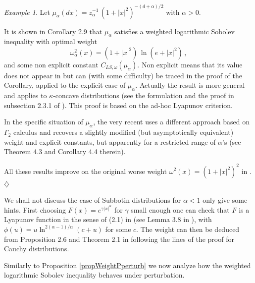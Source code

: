 \documentclass[11pt,reqno]{amsart}
\numberwithin{equation}{section}
\theoremstyle{definition}
\theoremstyle{remark}
\newtheorem{example}[theorem]{Example}
\begin{document}
\begin{example}\label{examplscauchy}
Let $\mu_\alpha(dx)= z_\alpha^{-1} \, (1+|x|^2)^{-(d+\alpha)/2}$ with $\alpha >0$. 

It is shown in \cite{CGWu} Corollary 2.9 that $\mu_\alpha$ satisfies a weighted logarithmic Sobolev inequality with optimal weight $$\omega_\alpha^2(x) = (1+|x|^2) \, \ln(e+|x|^2) \, ,$$ and some non explicit constant $C_{LS,\omega}(\mu_\alpha)$. Non explicit means that its value does not appear in \cite{CGWu} but can (with some difficulty) be traced in the proof of the Corollary, applied to the explicit case of $\mu_\alpha$. Actually the result is more general and applies to $\kappa$-concave distributions (see the formulation and the proof in subsection 2.3.1 of \cite{CGWu}). This proof is based on the ad-hoc Lyapunov criterion.

In the specific situation of $\mu_\alpha$, the very recent \cite{HugLS} uses a different approach based on $\Gamma_2$ calculus and recovers a slightly modified (but asymptotically equivalent)  weight and explicit constants, but apparently for a restricted range of $\alpha$'s (see Theorem 4.3 and Corollary 4.4 therein).

All these results improve on the original worse weight $\omega^2(x)=(1+|x|^2)^2$ in \cite{BLweight}.
\hfill $\diamondsuit$
\end{example}

We shall not discuss the case of Subbotin distributions for $\alpha <1$ only give some hints. First choosing $F(x)=e^{\gamma |x|^\alpha}$ for $\gamma$ small enough one can check that $F$ is a Lyapunov function in the sense of (2.1) in \cite{CGWu} (see Lemma 3.8 in \cite{CGGR}), with $\phi(u)=u\ln^{2(\alpha-1)/\alpha}(c+u)$ for some $c$. The weight can then be deduced from Proposition 2.6 and Theorem 2.1 in \cite{CGWu} following the lines of the proof for Cauchy distributions.


Similarly to Proposition \ref{propWeightPperturb} we now analyze how the weighted logarithmic Sobolev inequality behaves under perturbation.
\end{document}
